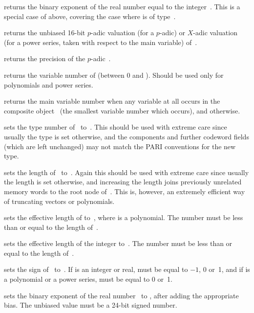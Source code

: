  returns the binary exponent of the real number equal
to the integer~. This is a special case of  above, covering
the case where  is of type~.

 returns the unbiased 16-bit $p$-adic valuation (for
a $p$-adic) or $X$-adic valuation (for a power series, taken with respect
to the main variable) of~.

 returns the precision of the $p$-adic~.

 returns the variable number of  (between 0 and
). Should be used only for polynomials and power series.

 returns the main variable number when any variable
at all occurs in the composite object~ (the smallest variable number
which occurs), and  otherwise.

 sets the type number of~ to~.
This should be used with extreme care since usually the type is set
otherwise, and the components and further codeword fields (which are left
unchanged) may not match the PARI conventions for the new type.

 sets the length of~ to~. Again
this should be used with extreme care since usually the length is set
otherwise, and increasing the length joins previously unrelated memory words
to the root node of~. This is, however, an extremely efficient way of
truncating vectors or polynomials.

 sets the effective length of 
to~, where  is a polynomial. The number  must be less
than or equal to the length of~.

 sets the effective length
of the integer  to~. The number  must be less than or
equal to the length of~.

 sets the sign of~ to~.
If  is an integer or real,  must be equal to $-1$, 0 or~1,
and if  is a polynomial or a power series,  must be equal to
0 or~1.

 sets the binary exponent of the real
number~ to , after adding the appropriate bias. The unbiased
value  must be a 24-bit signed number.

